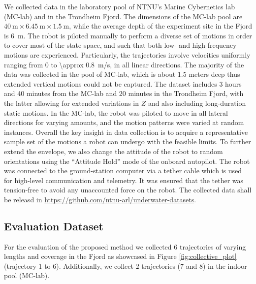 We collected data in the laboratory pool of NTNU's Marine Cybernetics lab (MC-lab) and in the Trondheim Fjord. The dimensions of the MC-lab pool are $\SI{40}{\meter}\times\SI{6.45}{\meter}\times\SI{1.5}{\meter}$, while the average depth of the experiment site in the Fjord is \SI{6}{\meter}. The robot is piloted manually to perform a diverse set of motions in order to cover most of the state space, and such that both low- and high-frequency motions are experienced. Particularly, the trajectories involve velocities uniformly ranging from $0$ to \SI{\approx 0.8}{\meter/\second}, in all linear directions. The majority of the data was collected in the pool of MC-lab, which is about 1.5 meters deep thus extended vertical motions could not be captured. The dataset includes 3 hours and 40 minutes from the MC-lab and 20 minutes in the Trondheim Fjord, with the latter allowing for extended variations in $Z$ and also including long-duration static motions. In the MC-lab, the robot was piloted to move in all lateral directions for varying amounts, and the motion patterns were varied at random instances. Overall the key insight in data collection is to acquire a representative sample set of the motions a robot can undergo with the feasible limits. To further extend the envelope, we also change the attitude of the robot to random orientations using the ``Attitude Hold'' mode of the onboard autopilot. The robot was connected to the ground-station computer via a tether cable which is used for high-level communication and telemetry. It was ensured that the tether was tension-free to avoid any unaccounted force on the robot. The collected data shall be releasd in \url{https://github.com/ntnu-arl/underwater-datasets}. 

\subsection{Evaluation Dataset} For the evaluation of the proposed method we collected $6$ trajectories of varying lengths and coverage in the Fjord as showcased in Figure \ref{fig:collective_plot} (trajectory $1$ to $6$). Additionally, we collect $2$ trajectories ($7$ and $8$) in the indoor pool (MC-lab).

